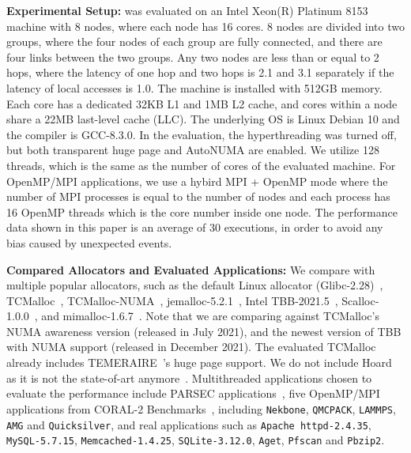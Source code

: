 \textbf{Experimental Setup:}  \NM{} was evaluated on an Intel Xeon(R) Platinum 8153 machine with 8 nodes, where each node has 16 cores. 8 nodes are divided into two groups, where the four nodes of each group are fully connected, and there are four links between the two groups. Any two nodes are less than or equal to 2 hops, where the latency of one hop and two hops is 2.1 and 3.1 separately if the latency of local accesses is 1.0. The machine is installed with 512GB memory. Each core has a dedicated 32KB L1 and 1MB L2 cache, and cores within a node share a 22MB last-level cache (LLC). The underlying OS is Linux Debian 10 and the compiler is GCC-8.3.0. In the evaluation, the hyperthreading was turned off, but both transparent huge page and AutoNUMA are enabled. We utilize 128 threads, which is the same as the number of cores of the evaluated machine. For OpenMP/MPI applications, we use a hybird MPI + OpenMP mode where the number of MPI processes is equal to the number of nodes and each process has 16 OpenMP threads which is the core number inside one node. The performance data shown in this paper is an average of 30 executions, in order to avoid any bias caused by unexpected events.


\textbf{Compared Allocators and Evaluated Applications: }  We compare \NM{} with multiple popular allocators, such as the default Linux allocator (Glibc-2.28)~\cite{glibcweb}, TCMalloc~\cite{tcmalloc2},  TCMalloc-NUMA~\cite{tcmallocnuma}, jemalloc-5.2.1~\cite{jemalloc}, Intel TBB-2021.5~\cite{tbb2}, Scalloc-1.0.0~\cite{Scalloc}, and mimalloc-1.6.7~\cite{mimalloc}. Note that we are comparing against TCMalloc's NUMA awareness version (released in July 2021), and the newest version of TBB with NUMA support (released in December 2021). The evaluated TCMalloc already includes TEMERAIRE~\cite{TEMERAIRE}'s huge page support. 
We do not include Hoard~\cite{Hoard} as it is not the state-of-art anymore~\cite{Scalloc, mimalloc}. Multithreaded applications chosen to evaluate the performance include PARSEC applications~\cite{parsec}, five OpenMP/MPI applications from CORAL-2 Benchmarks~\cite{coral2}, including \texttt{Nekbone}, \texttt{QMCPACK}, \texttt{LAMMPS}, \texttt{AMG} and \texttt{Quicksilver}, and real applications such as \texttt{Apache httpd-2.4.35}, \texttt{MySQL-5.7.15}, \texttt{Memcached-1.4.25}, \texttt{SQLite-3.12.0}, \texttt{Aget}, \texttt{Pfscan} and \texttt{Pbzip2}. 

